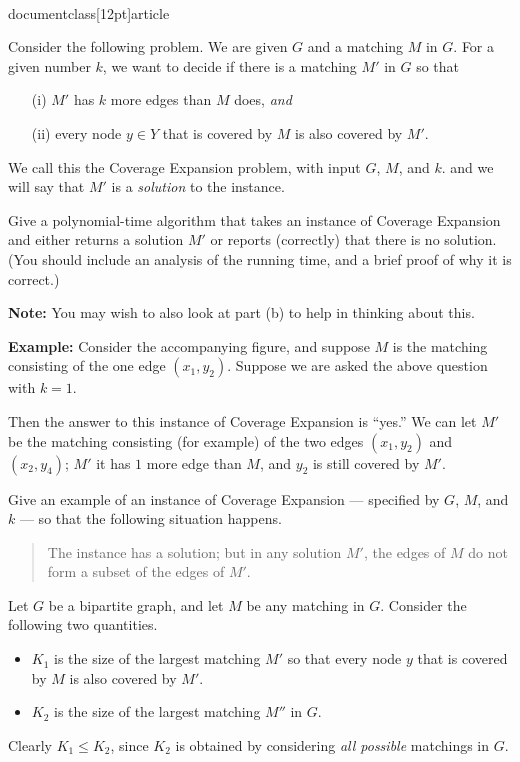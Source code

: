 \\documentclass[12pt]{article}
\begin{document}
\begin{enumerate}
Consider the following problem.
We are given $G$ and a matching $M$ in $G$.
For a given number $k$, we want to decide if there
is a matching $M'$ in $G$ so that
\begin{itemize}
\item[(i)] $M'$ has $k$ more edges than $M$ does, {\em and}
\item[(ii)] every node $y \in Y$ that is covered
by $M$ is also covered by $M'$.
\end{itemize}
We call this the {\sc Coverage Expansion}
problem, with input $G$, $M$, and $k$.
and we will say that $M'$ is a {\em solution} to the instance.

Give a polynomial-time algorithm that takes an instance
of {\sc Coverage Expansion} and either returns a solution $M'$
or reports (correctly) that there is no solution.
(You should include an analysis of the running time,
and a brief proof of why it is correct.)

{\bf Note:} You may wish to also look at part (b) 
to help in thinking about this.

\medskip
{\bf Example:} Consider the accompanying figure,
and suppose $M$ is the matching consisting of the
one edge $(x_1,y_2)$.
Suppose we are asked the above question with $k = 1$.

Then the answer to this instance
of {\sc Coverage Expansion} is ``yes.''
We can let $M'$ be the matching consisting (for example)
of the two edges $(x_1,y_2)$ and $(x_2,y_4)$;
$M'$ it has $1$ more edge than $M$, and
$y_2$ is still covered by $M'$.

Give an example of an instance of
{\sc Coverage Expansion} --- specified by $G$, $M$, and $k$ ---
so that the following situation happens.
\begin{quote}
The instance has a solution; but in any solution $M'$,
the edges of $M$ do not form a subset of the edges of $M'$.
\end{quote}

Let $G$ be a bipartite graph, and let $M$ be any matching in $G$.
Consider the following two quantities.
\begin{itemize}
\item $K_1$ is the size of the largest matching $M'$
so that every node $y$ that is covered by $M$ is also covered by $M'$.
\item $K_2$ is the size of the largest matching $M''$ in $G$.
\end{itemize}
Clearly $K_1 \leq K_2$, since $K_2$ is obtained by considering
{\em all possible} matchings in $G$.


\end{enumerate}
\end{document}
